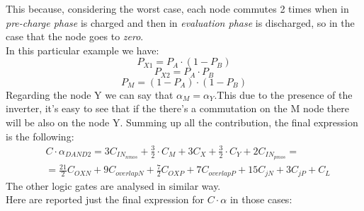 \documentclass[12pt,  english, makeidx, a4paper, titlepage, oneside]{article}
\begin{document}
This because, considering the worst case, each node commutes 2 times when in \textit{pre-charge phase} is charged and then in \textit{evaluation phase} is discharged, so in the case that the node goes to \textit{zero}.\\
In this particular example we have:
\begin{equation}
P_{X1}=P_A \cdot (1-P_B)
\end{equation}
\begin{equation}
P_{X2}=P_A \cdot P_B
\end{equation}
\begin{equation}
P_{M}=(1-P_A) \cdot (1-P_B)
\end{equation}
Regarding the node Y we can say that $ \alpha_M = \alpha_Y $.This due to the presence of the inverter, it's easy to see that if the there's a commutation on the M node there will be also on the node Y.
Summing up all the contribution, the final expression is the following:
\begin{equation}
\begin{split}
&
C \cdot \alpha_{DAND2} = 3 C_{IN_{nmos}}+\frac{3}{2}\cdot C_M+3C_X+\frac{3}{2}\cdot C_Y+2C_{IN_{pmos}}=
\\&
=\frac{21}{2} C_{OXN}+9C_{overlapN}+\frac{7}{2}C_{OXP}+7C_{overlapP}+15C_{jN}+3C_{jP}+C_L
\end{split}
\end{equation}
The other logic gates are analysed in similar way.\\
Here are reported just the final expression for $ C \cdot \alpha $ in those cases:
\end{document}
